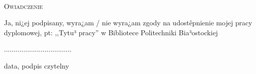 \documentclass[magisterium,oneside,10pt]{wipb}
\begin{document}

\maketitle

\tableofcontents
\thispagestyle{empty}

\setcounter{page}{0}





\lstlistoflistings
\thispagestyle{empty}

\listoffigures
\listoftables

\pagebreak
\pagestyle{empty}
~\\ \vspace{2cm}
\begin{center}
{\Large    \textsc{Owiadczenie}}
\end{center}
\vspace{2cm}
Ja, ni¿ej podpisany, wyra¿am / nie wyra¿am zgody na udostêpnienie mojej pracy dyplomowej,  pt: ,,Tytu³  pracy''
w Bibliotece  Politechniki Bia³ostockiej



\begin{flushright}
...................................

data,  podpis czytelny 
\end{flushright}
\end{document}
